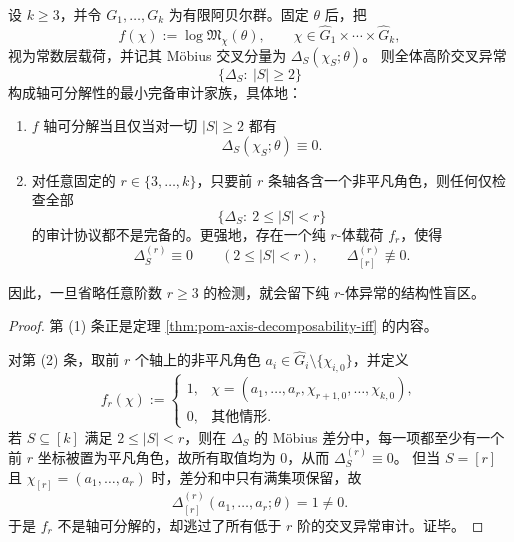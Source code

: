 \begin{theorem}[高阶交叉异常审计的锐完备阈值]\label{thm:xi-time-part79-cross-anom-sharp-completeness-threshold}
设 \(k\ge 3\)，并令 \(G_1,\dots,G_k\) 为有限阿贝尔群。固定 \(\theta\) 后，把
\[
f(\chi):=\log\mathfrak{M}_{\chi}(\theta),
\qquad
\chi\in \widehat G_1\times\cdots\times\widehat G_k,
\]
视为常数层载荷，并记其 Möbius 交叉分量为 \(\Delta_S(\chi_S;\theta)\)。
则全体高阶交叉异常
\[
\{\Delta_S:\ |S|\ge 2\}
\]
构成轴可分解性的最小完备审计家族，具体地：
\begin{enumerate}
  \item \(f\) 轴可分解当且仅当对一切 \(|S|\ge 2\) 都有
  \[
  \Delta_S(\chi_S;\theta)\equiv 0.
  \]
  \item 对任意固定的 \(r\in\{3,\dots,k\}\)，只要前 \(r\) 条轴各含一个非平凡角色，则任何仅检查全部
  \[
  \{\Delta_S:\ 2\le |S|<r\}
  \]
  的审计协议都不是完备的。更强地，存在一个纯 \(r\)-体载荷 \(f_r\)，使得
  \[
  \Delta_S^{(r)}\equiv 0\qquad(2\le |S|<r),
  \qquad
  \Delta_{[r]}^{(r)}\not\equiv 0.
  \]
\end{enumerate}
因此，一旦省略任意阶数 \(r\ge 3\) 的检测，就会留下纯 \(r\)-体异常的结构性盲区。
\end{theorem}
\begin{proof}
第 (1) 条正是定理 \ref{thm:pom-axis-decomposability-iff} 的内容。

对第 (2) 条，取前 \(r\) 个轴上的非平凡角色 \(a_i\in\widehat G_i\setminus\{\chi_{i,0}\}\)，并定义
\[
f_r(\chi):=
\begin{cases}
1,& \chi=(a_1,\dots,a_r,\chi_{r+1,0},\dots,\chi_{k,0}),\\
0,& \text{其他情形}.
\end{cases}
\]
若 \(S\subseteq[k]\) 满足 \(2\le |S|<r\)，则在 \(\Delta_S\) 的 Möbius 差分中，每一项都至少有一个前 \(r\) 坐标被置为平凡角色，故所有取值均为 \(0\)，从而
\(
\Delta_S^{(r)}\equiv 0
\)。
但当 \(S=[r]\) 且 \(\chi_{[r]}=(a_1,\dots,a_r)\) 时，差分和中只有满集项保留，故
\[
\Delta_{[r]}^{(r)}(a_1,\dots,a_r;\theta)=1\neq 0.
\]
于是 \(f_r\) 不是轴可分解的，却逃过了所有低于 \(r\) 阶的交叉异常审计。证毕。
\end{proof}

